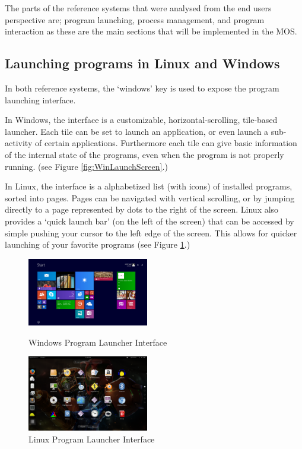 \documentclass[a4paper]{report}
\begin{document}
The parts of the reference systems that were analysed from the end users perspective are; program launching, process management, and program interaction as these are the main sections that will be implemented in the MOS.

\subsection{Launching programs in Linux and Windows}

In both reference systems, the `windows' key is used to expose the program launching interface.

In Windows, the interface is a customizable, horizontal-scrolling, tile-based launcher. Each tile can be set to launch an application, or even launch a sub-activity of certain applications. Furthermore each tile can give basic information of the internal state of the programs, even when the program is not properly running. (see Figure \ref{fig:WinLaunchScreen}.)


In Linux, the interface is a alphabetized list (with icons) of installed programs, sorted into pages. Pages can be navigated with vertical scrolling, or by jumping directly to a page represented by dots to the right of the screen. Linux also provides a `quick launch bar' (on the left of the screen) that can be accessed by simple pushing your cursor to the left edge of the screen. This allows for quicker launching of your favorite programs (see Figure \ref{fig:LinLaunchScreen}.)


\begin{figure}[ht]
\centering
\begin{minipage}{.5\textwidth}
  \centering
  \includegraphics[width=200px]{images/Windows_Program_Launcher_Screenshot}
  \caption{Windows Program Launcher Interface}
  \label{fig:WinLaunchScreen}
\end{minipage}%
\begin{minipage}{.5\textwidth}
  \centering
  \includegraphics[width=200px]{images/Linux_Program_Launcher_Screenshot}
  \caption{Linux Program Launcher Interface}
  \label{fig:LinLaunchScreen}
\end{minipage}
\end{figure}
\end{document}
